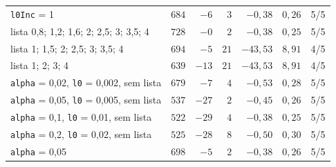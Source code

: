 \documentclass[11pt,a4paper]{article}
\numberwithin{equation}{section}
\begin{document}
{\begin{longtable}{p{6.4cm}rrrrrc}
\texttt{l0Inc} = 1 & $684$ & $-6$ & $3$ & $-0{,}38$ & $0{,}26$ & 5/5 \\
lista 0{,}8; 1{,}2; 1{,}6; 2; 2{,}5; 3; 3{,}5; 4 & $728$ & $-0$ & $2$ & $-0{,}38$ & $0{,}25$ & 5/5 \\
lista 1; 1{,}5; 2; 2{,}5; 3; 3{,}5; 4 & $694$ & $-5$ & $21$ & $-43{,}53$ & $8{,}91$ & 4/5 \\
lista 1; 2; 3; 4 & $639$ & $-13$ & $21$ & $-43{,}53$ & $8{,}91$ & 4/5 \\
\texttt{alpha} = 0,02, \texttt{l0} = 0,002, sem lista & $679$ & $-7$ & $4$ & $-0{,}53$ & $0{,}28$ & 5/5 \\
\texttt{alpha} = 0,05, \texttt{l0} = 0,005, sem lista & $537$ & $-27$ & $2$ & $-0{,}45$ & $0{,}26$ & 5/5 \\
\texttt{alpha} = 0,1, \texttt{l0} = 0,01, sem lista & $522$ & $-29$ & $4$ & $-0{,}38$ & $0{,}25$ & 5/5 \\
\texttt{alpha} = 0,2, \texttt{l0} = 0,02, sem lista & $525$ & $-28$ & $8$ & $-0{,}50$ & $0{,}30$ & 5/5 \\
\texttt{alpha} = 0,05 & $698$ & $-5$ & $2$ & $-0{,}38$ & $0{,}26$ & 5/5 \\
\end{longtable}
}
\end{document}

